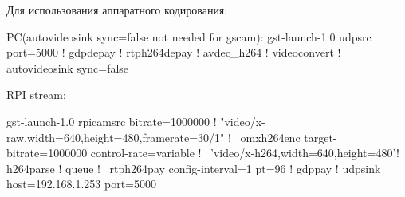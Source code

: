 
Для использования аппаратного кодирования:

PC(autovideosink sync=false not needed for gscam):
gst-launch-1.0 udpsrc port=5000 ! gdpdepay ! rtph264depay ! avdec\_h264 ! videoconvert ! autovideosink sync=false

RPI stream:

gst-launch-1.0 rpicamsrc bitrate=1000000 ! "video/x-raw,width=640,height=480,framerate=30/1" ! \
omxh264enc target-bitrate=1000000 control-rate=variable ! \
'video/x-h264,width=640,height=480'! h264parse ! queue ! \
rtph264pay config-interval=1 pt=96 ! gdppay ! udpsink host=192.168.1.253 port=5000
